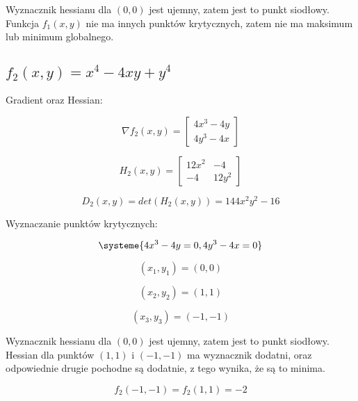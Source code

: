 \documentclass{article}
\begin{document}
	Wyznacznik hessianu dla $(0,0)$ jest ujemny, zatem jest to punkt siodłowy. Funkcja $f_1(x,y)$ nie ma innych punktów krytycznych, zatem nie ma maksimum lub minimum globalnego.


	\subsection*{$f_2(x,y) = x^4 - 4xy + y^4$}

	Gradient oraz Hessian:

	\begin{equation}
		\nabla f_2(x,y) = \begin{bmatrix} 4x^3-4y \\ 4y^3-4x \end{bmatrix}
	\end{equation}

	\begin{equation}
		H_2(x,y) = \begin{bmatrix} 12x^2 & -4\\ -4 & 12y^2\end{bmatrix}
	\end{equation}

	\begin{equation}
		D_2(x,y) = det(H_2(x,y)) = 144x^2y^2-16
	\end{equation}

	Wyznaczanie punktów krytycznych:

	\begin{equation}
		\systeme{4x^3-4y = 0,4y^3-4x = 0}
	\end{equation}

	\begin{equation}
		(x_1,y_1) = (0,0)
	\end{equation}

	\begin{equation}
		(x_2,y_2) = (1,1)
	\end{equation}

	\begin{equation}
		(x_3,y_3) = (-1,-1)
	\end{equation}

	Wyznacznik hessianu dla $(0,0)$ jest ujemny, zatem jest to punkt siodłowy. Hessian dla punktów $(1,1)$ i $(-1,-1)$ ma wyznacznik dodatni, oraz odpowiednie drugie pochodne są dodatnie, z tego wynika, że są to minima.
	
	\begin{equation}
		f_2(-1,-1) = f_2(1,1) = -2
	\end{equation}
\end{document}
